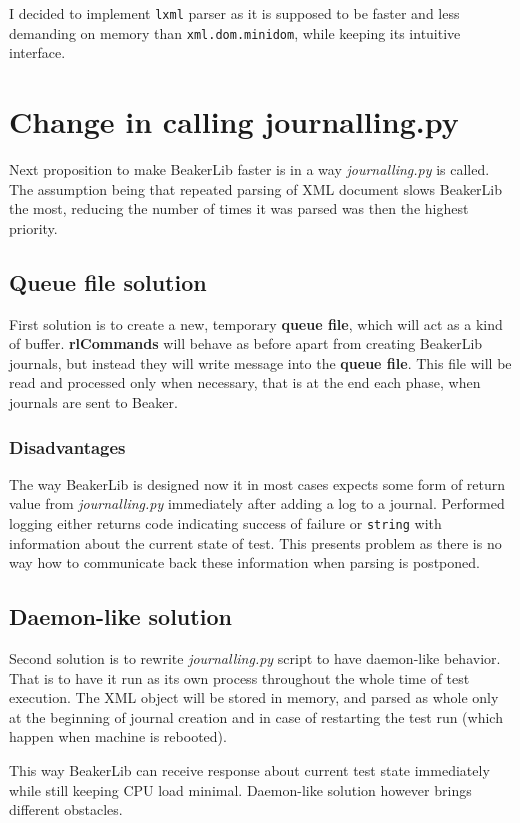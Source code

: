 I decided to implement \texttt{lxml} parser as it is supposed to be faster and less demanding on memory than \texttt{xml.dom.minidom}\cite{lxml_performance}, while keeping its intuitive interface.

\section{Change in calling journalling.py}
Next proposition to make BeakerLib faster is in a way \textit{journalling.py} is called. The assumption being that repeated parsing of XML document slows BeakerLib the most, reducing the number of times it was parsed was then the highest priority. 

\subsection{Queue file solution}
First solution is to create a new, temporary \textbf{queue file}, which will act as a kind of buffer. \mbox{\textbf{rlCommands}} will behave as before apart from creating BeakerLib journals, but instead they will write message into the \textbf{queue file}. This file will be read and processed only when necessary, that is at the end each phase, when journals are sent to Beaker.

\subsubsection{Disadvantages}
The way BeakerLib is designed now it in most cases expects some form of return value from \textit{journalling.py} immediately after adding a log to a journal. Performed logging either returns code indicating success of failure or \texttt{string} with information about the current state of test. This presents problem as there is no way how to communicate back these information when parsing is postponed. 

\subsection{Daemon-like solution}
Second solution is to rewrite \textit{journalling.py} script to have daemon-like behavior. That is to have it run as its own process throughout the whole time of test execution. The XML object will be stored in memory, and parsed as whole only at the beginning of journal creation and in case of restarting the test run (which happen when machine is rebooted).  

This way BeakerLib can receive response about current test state immediately while still keeping CPU load minimal. Daemon-like solution however brings different obstacles.

